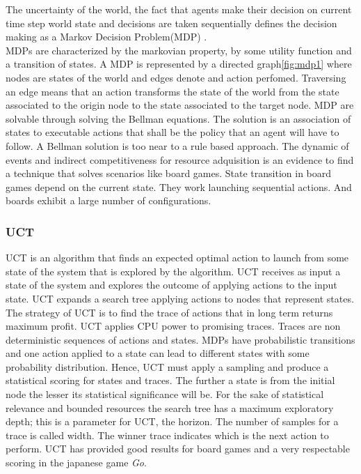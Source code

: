 \documentclass[11pt,oneside,a4paper,openright]{report}
\begin{document}
The uncertainty of the world, the fact that agents make their decision on current time step
world state and decisions are taken sequentially defines the decision making as a Markov Decision Problem(MDP)
\cite[chapter.17]{RussellNorvig}.\\
MDPs are characterized by the markovian property, by some utility function and a transition of states. A MDP is represented by a directed graph\ref{fig:mdp1} where nodes are states of the world and edges denote
and action perfomed. Traversing an edge means that an action transforms the state of the world from the state associated to the origin node to the state associated to the target node. MDP are solvable through solving the Bellman equations. The solution is an association of states to executable actions that shall be the policy that an agent will have to follow. A Bellman solution is too near to a rule based approach. The dynamic of events and indirect competitiveness for resource adquisition is an evidence to find a technique that solves scenarios like board games. State transition in board games depend on the current state. They work launching sequential actions. And boards exhibit a large number of configurations. 

\subsubsection{UCT} 
\label{sec:UCT}

UCT \cite{BallaFern2009} \cite{BonetGeffner2012} is an algorithm that finds an expected optimal action to launch from some state of the system that is explored by the algorithm. UCT receives as input a state of the system and explores the outcome of applying actions to the input state. UCT expands a search tree applying actions to nodes
that represent states. The strategy of UCT is to find the trace of actions that in long term returns maximum profit.
UCT applies CPU power to promising traces. Traces are non deterministic sequences of actions and states. MDPs have probabilistic transitions and one action applied to a state can lead to different states with some probability distribution. Hence, UCT must apply a sampling and produce a statistical scoring for states and traces. The further a state is from the initial node the lesser its statistical significance will be. For the sake of statistical relevance and bounded resources the search tree has a maximum exploratory depth; this is a parameter for UCT, the horizon.
The number of samples for a trace is called width. The winner trace indicates which is the next action to perform. UCT has provided good results for board games and a very respectable scoring in the japanese game \emph{Go}\cite{uctGO}. 
\end{document}
